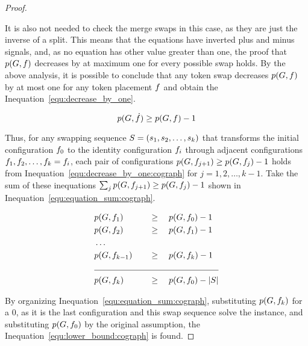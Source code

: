 \documentclass[msc,english,table,xcdraw]{ppgccufmg}
\begin{document}
\begin{proof}
\begin{itemize}
\end{itemize}

It is also not needed to check the merge swaps in this case, as they are just the inverse
of a split.
This means that the equations have inverted plus and minus signals, and, as no equation
has other value greater than one, the proof that $p(G, f)$
decreases by at maximum one for every possible swap holds.
By the above analysis, it is possible to conclude that any token swap decreases
$p(G, f)$ by at most one for any token placement $f$ and
obtain the Inequation~\ref{equ:decrease_by_one}.
    
\begin{equation}
    \centering
    \label{equ:decrease_by_one:cograph}
    \applyFunc{p}{\graphG, \sub{\mapFunc}} \geq \applyFunc{p}{\graphG, \mapFunc} - 1
\end{equation}

Thus, for any swapping sequence $S = (s_1, s_2, \ldots, 
s_k)$ that transforms the initial configuration $f_{0}$ to the identity
configuration $f_{i}$ through adjacent configurations $f_{1}, f_2,
\ldots, f_{k} = f_{i}$, each pair of configurations $p(G, 
f_{j+1}) \geq p(G, f_{j}) -1$ holds from 
Inequation~\ref{equ:decrease_by_one:cograph} for $j = 1,2,\ldots,k-1$.
Take the sum of these inequations $\sum_{j} p(G, f_{j+1}) \geq p(G, f_{j}) -1$ shown in Inequation~\ref{equ:equation_sum:cograph}.
    
\begin{alignat}{2}
\centering
\label{equ:equation_sum:cograph}
&\applyFunc{p}{\graphG, \mapFunc_{1}}  \quad && \geq \quad \applyFunc{p}{\graphG, \mapFunc_{0}} -1 \nonumber \\
&\applyFunc{p}{\graphG, \mapFunc_{2}} \quad && \geq \quad \applyFunc{p}{\graphG, \mapFunc_{1}} -1 \nonumber \\
&\ldots \nonumber \\
&\applyFunc{p}{\graphG, \mapFunc_{k-1}} \quad && \geq \quad \applyFunc{p}{\graphG, \mapFunc_{k}} -1 \nonumber \\
 \cline{1-4}
&\applyFunc{p}{\graphG, \mapFunc_{k}} \quad && \geq \quad \applyFunc{p}{\graphG, \mapFunc_{0}} - \sizeof{\swapSeq}
\end{alignat}
    
By organizing Inequation~\ref{equ:equation_sum:cograph}, substituting $p(G, 
f_{k})$ for a $0$, as it is the last configuration and this swap sequence solve the
instance, and substituting $p(G, f_{0})$ by the original assumption,
the Inequation~\ref{equ:lower_bound:cograph} is found.
    

\end{proof}
\end{document}

